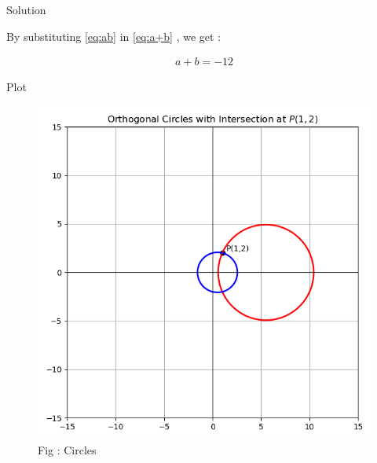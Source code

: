\documentclass{beamer}
\numberwithin{equation}{section}
\theoremstyle{remark}
\begin{document}
\begin{frame}{Solution}

By substituting \eqref{eq:ab} in \eqref{eq:a+b} , we get :

\begin{align}
a + b = -12
\end{align}

\end{frame}

\begin{frame}{Plot}

\begin{figure}[h!]
  \centering
  \includegraphics[width=0.6\columnwidth]{figs/circles.png} 
   \caption*{Fig : Circles}
  \label{Fig1}
\end{figure}

\end{frame}
\end{document}
